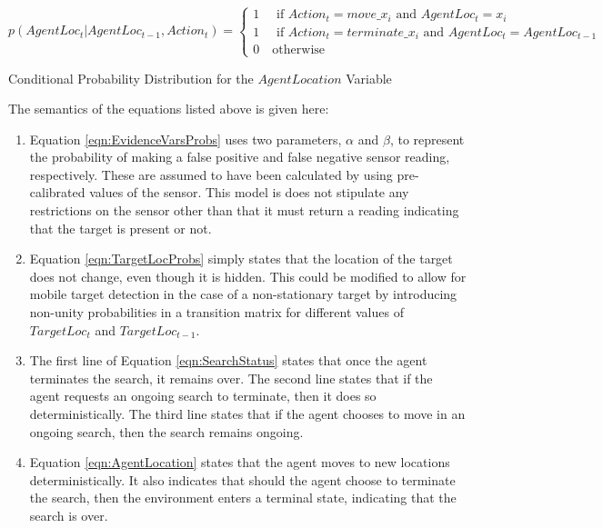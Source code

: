 \scriptsize
    \begin{equation}\label{eqn:AgentLocation}
        p(AgentLoc_t | AgentLoc_{t-1}, Action_{t}) = 
        \begin{cases}
        1 \quad \text{ if } Action_t = move\_x_i \text{ and } AgentLoc_t = x_i
        \\
        1 \quad \text{ if } Action_t = terminate\_x_i \text{ and } AgentLoc_t = AgentLoc_{t-1}
        \\
        0 \quad \text{otherwise}
        \end{cases}
    \end{equation}
\begin{center}
    \normalsize
    Conditional Probability Distribution for the $AgentLocation$ Variable
\end{center}

\normalsize
The semantics of the equations listed above is given here: 
\begin{enumerate}
    \item Equation \ref{eqn:EvidenceVarsProbs} uses two parameters, $\alpha$ and $\beta$, to represent the probability of making a false positive and false negative sensor reading, respectively. These are assumed to have been calculated by using pre-calibrated values of the sensor. This model is does not stipulate any restrictions on the sensor other than that it must return a reading indicating that the target is present or not.
    \item  Equation \ref{eqn:TargetLocProbs} simply states that the location of the target does not change, even though it is hidden. This could be modified to allow for mobile target detection in the case of a non-stationary target by introducing non-unity probabilities in a transition matrix for different values of $TargetLoc_t$ and $TargetLoc_{t-1}$.
    \item The first line of Equation \ref{eqn:SearchStatus} states that once the agent terminates the search, it remains over. The second line states that if the agent requests an ongoing search to terminate, then it does so deterministically. The third line states that if the agent chooses to move in an ongoing search, then the search remains ongoing.
    \item Equation \ref{eqn:AgentLocation} states that the agent moves to new locations deterministically. It also indicates that should the agent choose to terminate the search, then the environment enters a terminal state, indicating that the search is over.
\end{enumerate}


